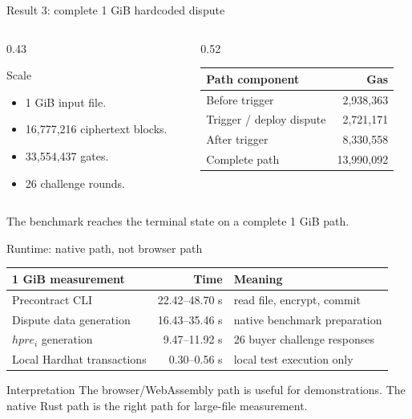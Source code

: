 \documentclass[aspectratio=169,10pt]{beamer}
\newcommand{\giB}{GiB}
\begin{document}
\begin{frame}{Result 3: complete 1 \giB{} hardcoded dispute}
  \begin{columns}[T,onlytextwidth]
    \begin{column}{0.43\textwidth}
      \begin{block}{Scale}
        \begin{itemize}
          \item 1 \giB{} input file.
          \item 16,777,216 ciphertext blocks.
          \item 33,554,437 gates.
          \item 26 challenge rounds.
        \end{itemize}
      \end{block}
    \end{column}
    \begin{column}{0.52\textwidth}
      \begin{center}
        \begin{tabular}{lr}
          \toprule
          Path component & Gas \\
          \midrule
          Before trigger & 2,938,363 \\
          Trigger / deploy dispute & 2,721,171 \\
          After trigger & 8,330,558 \\
          \midrule
          Complete path & 13,990,092 \\
          \bottomrule
        \end{tabular}
      \end{center}
    \end{column}
  \end{columns}
  \vfill
  \centering
  \large \textcolor{goodgreen}{The benchmark reaches the terminal state on a complete 1 \giB{} path.}
\end{frame}

\begin{frame}{Runtime: native path, not browser path}
  \begin{center}
    \small
    \begin{tabular}{lrl}
      \toprule
      1 \giB{} measurement & Time & Meaning \\
      \midrule
      Precontract CLI & 22.42--48.70 s & read file, encrypt, commit \\
      Dispute data generation & 16.43--35.46 s & native benchmark preparation \\
      \(hpre_i\) generation & 9.47--11.92 s & 26 buyer challenge responses \\
      Local Hardhat transactions & 0.30--0.56 s & local test execution only \\
      \bottomrule
    \end{tabular}
  \end{center}
  \vspace{0.8em}
  \begin{block}{Interpretation}
    The browser/WebAssembly path is useful for demonstrations. The native Rust path is the
    right path for large-file measurement.
  \end{block}
\end{frame}
\end{document}
